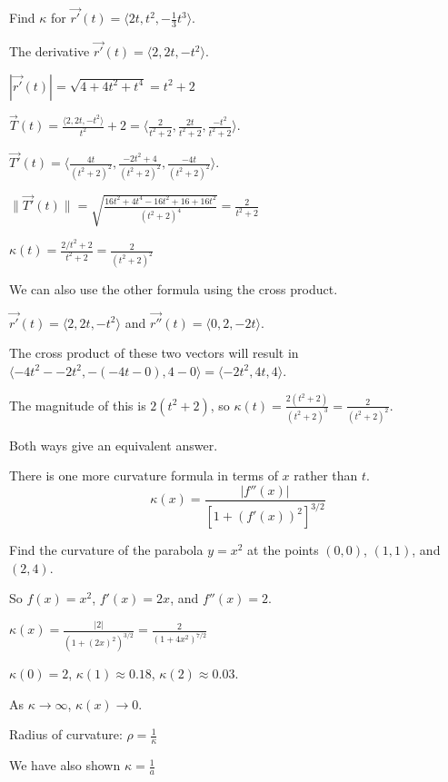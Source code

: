 \documentclass[../calc3.tex]{subfiles}
\begin{document}
\pagebreak
\begin{example}
    Find $\kappa$ for $\vec{r'}(t)=\langle 2t,t^2,-\frac{1}{3}t^3\rangle$.

    The derivative $\vec{r'}(t)=\langle 2,2t,-t^2\rangle$.

    $|\vec{r'}(t)|=\sqrt{4+4t^2+t^4}=t^2+2$

    $\vec{T}(t)=\frac{\langle 2,2t,-t^2\rangle}{t^2}+2 = \langle \frac{2}{t^2+2}, \frac{2t}{t^2+2}, \frac{-t^2}{t^2+2}\rangle$.

    $\vec{T'}(t)=\langle \frac{4t}{(t^2+2)^2}, \frac{-2t^2+4}{(t^2+2)^2}, \frac{-4t}{(t^2+2)^2}\rangle$.

    $\| \vec{T'}(t)\| = \sqrt{\frac{16t^2+4t^4-16t^2+16+16t^2}{(t^2+2)^4}} = \frac{2}{t^2+2}$

    $\kappa (t)=\frac{2/t^2+2}{t^2+2}=\frac{2}{(t^2+2)^2}$



    We can also use the other formula using the cross product.

    $\vec{r'}(t)=\langle 2,2t,-t^2\rangle$ and $\vec{r''}(t)=\langle 0,2,-2t\rangle$.

    The cross product of these two vectors will result in $\langle -4t^2--2t^2, -(-4t-0), 4-0\rangle = \langle -2t^2,4t,4\rangle$.

    The magnitude of this is $2(t^2+2)$, so $\kappa (t)=\frac{2(t^2+2)}{(t^2+2)^3} = \frac{2}{(t^2+2)^2}$.

    Both ways give an equivalent answer.
\end{example}

There is one more curvature formula in terms of $x$ rather than $t$.
\[ \kappa(x)=\frac{|f''(x)|}{[1+(f'(x))^2]^{3/2}} \]

\begin{example}
    Find the curvature of the parabola $y=x^2$ at the points $(0,0)$, $(1,1)$, and $(2,4)$.

    So $f(x)=x^2$, $f'(x)=2x$, and $f''(x)=2$.

    $\kappa (x)=\frac{|2|}{(1+(2x)^2)^{3/2}} = \frac{2}{(1+4x^2)^{7/2}}$

    $\kappa(0)=2$, $\kappa(1)\approx 0.18$, $\kappa(2) \approx 0.03$.

    As $\kappa \rightarrow \infty$, $\kappa (x)\rightarrow 0$.
\end{example}

Radius of curvature: $\rho = \frac{1}{\kappa}$

We have also shown $\kappa = \frac{1}{a}$
\end{document}
